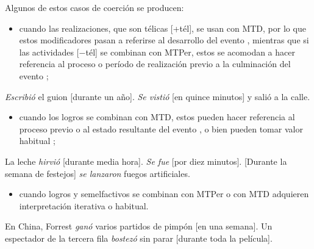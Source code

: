 Algunos de estos casos de coerción se producen:

\begin{itemize}
  \item cuando las realizaciones, que son télicas [+tél], se usan con MTD, por
        lo que estos modificadores pasan a referirse al desarrollo del evento
        , mientras que si las actividades [$-$tél] se
        combinan con MTPer, estos se acomodan a hacer referencia al proceso o
        período de realización previo a la culminación del evento
        ;
\end{itemize}

\begin{exe}
  \ex\label{ex:08-escribio} \textit{Escribió} el guion [durante un año].
  \ex\label{ex:08-vistio} \textit{Se vistió} [en quince minutos] y salió a la
      calle.
\end{exe}

\begin{itemize}
  \item cuando los logros se combinan con MTD, estos pueden hacer referencia al
        proceso previo  o al estado resultante del evento
        , o bien pueden tomar valor habitual
        ;
\end{itemize}

\begin{exe}
  \ex\label{ex:08-hirvio} La leche \textit{hirvió} [durante media hora].
  \ex\label{ex:08-sefue} \textit{Se fue} [por diez minutos].
  \ex\label{ex:08-fuegos} [Durante la semana de festejos] \textit{se lanzaron}
      fuegos artificiales.
\end{exe}

\begin{itemize}
  \item cuando logros y semelfactivos se combinan con MTPer o con MTD adquieren
        interpretación iterativa o habitual.
\end{itemize}

\begin{exe}
  \ex En China, Forrest \textit{ganó} varios partidos de pimpón [en una semana].
  \ex Un espectador de la tercera fila \textit{bostezó} sin parar [durante toda
      la película].
\end{exe}

